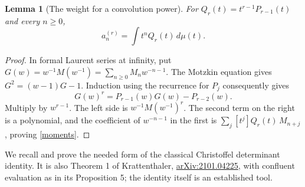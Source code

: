 \documentclass[10pt]{article}
\newtheorem{lemma}{Lemma}
\begin{document}
\begin{lemma}[The weight for a convolution power]\label{weight}
For $Q_r(t)=t^{r-1}P_{r-1}(t)$ and every $n\ge0$,
\begin{equation}\label{moments}
 a_n^{(r)}=\int t^n Q_r(t)\,d\mu(t).
\end{equation}
\end{lemma}
\begin{proof}
In formal Laurent series at infinity, put
$G(w)=w^{-1}M(w^{-1})=\sum_{n\ge0}M_nw^{-n-1}$.
The Motzkin equation gives $G^2=(w-1)G-1$. Induction using the
recurrence for $P_j$ consequently gives
\[
 G(w)^r=P_{r-1}(w)G(w)-P_{r-2}(w).
\]
Multiply by $w^{r-1}$. The left side is $w^{-1}M(w^{-1})^r$.
The second term on the right is a polynomial, and the coefficient
of $w^{-n-1}$ in the first is
$\sum_j[t^j]Q_r(t)\,M_{n+j}$, proving \eqref{moments}.
\end{proof}

We recall and prove the needed form of the classical
Christoffel determinant identity. It is also Theorem 1 of
Krattenthaler, \href{https://arxiv.org/abs/2101.04225}{arXiv:2101.04225},
with confluent evaluation as in its Proposition 5; the identity itself
is an established tool.
\end{document}
